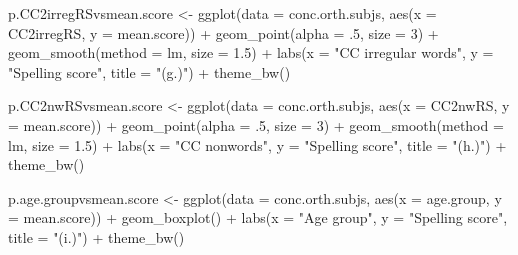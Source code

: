 \documentclass[
  letterpaper,
  DIV=11,
  numbers=noendperiod]{scrreprt}
\newenvironment{Shaded}{\begin{snugshade}}{\end{snugshade}}
\newcommand{\AttributeTok}[1]{\textcolor[rgb]{0.40,0.45,0.13}{#1}}
\newcommand{\DecValTok}[1]{\textcolor[rgb]{0.68,0.00,0.00}{#1}}
\newcommand{\FloatTok}[1]{\textcolor[rgb]{0.68,0.00,0.00}{#1}}
\newcommand{\FunctionTok}[1]{\textcolor[rgb]{0.28,0.35,0.67}{#1}}
\newcommand{\NormalTok}[1]{\textcolor[rgb]{0.00,0.23,0.31}{#1}}
\newcommand{\OtherTok}[1]{\textcolor[rgb]{0.00,0.23,0.31}{#1}}
\newcommand{\SpecialCharTok}[1]{\textcolor[rgb]{0.37,0.37,0.37}{#1}}
\newcommand{\StringTok}[1]{\textcolor[rgb]{0.13,0.47,0.30}{#1}}
\begin{document}
\begin{Shaded}
\begin{Highlighting}[]
\NormalTok{p.CC2irregRSvsmean.score }\OtherTok{\textless{}{-}} \FunctionTok{ggplot}\NormalTok{(}\AttributeTok{data =}\NormalTok{ conc.orth.subjs, }
                              \FunctionTok{aes}\NormalTok{(}\AttributeTok{x =}\NormalTok{ CC2irregRS, }
                                  \AttributeTok{y =}\NormalTok{ mean.score)) }\SpecialCharTok{+}
  \FunctionTok{geom\_point}\NormalTok{(}\AttributeTok{alpha =}\NormalTok{ .}\DecValTok{5}\NormalTok{, }\AttributeTok{size =} \DecValTok{3}\NormalTok{) }\SpecialCharTok{+}
  \FunctionTok{geom\_smooth}\NormalTok{(}\AttributeTok{method =} \StringTok{\textquotesingle{}lm\textquotesingle{}}\NormalTok{, }\AttributeTok{size =} \FloatTok{1.5}\NormalTok{) }\SpecialCharTok{+}
  \FunctionTok{labs}\NormalTok{(}\AttributeTok{x =} \StringTok{"CC irregular words"}\NormalTok{, }
       \AttributeTok{y =} \StringTok{"Spelling score"}\NormalTok{,}
       \AttributeTok{title =} \StringTok{"(g.)"}\NormalTok{) }\SpecialCharTok{+}
  \FunctionTok{theme\_bw}\NormalTok{()}

\NormalTok{p.CC2nwRSvsmean.score }\OtherTok{\textless{}{-}} \FunctionTok{ggplot}\NormalTok{(}\AttributeTok{data =}\NormalTok{ conc.orth.subjs, }
                              \FunctionTok{aes}\NormalTok{(}\AttributeTok{x =}\NormalTok{ CC2nwRS, }
                                  \AttributeTok{y =}\NormalTok{ mean.score)) }\SpecialCharTok{+}
  \FunctionTok{geom\_point}\NormalTok{(}\AttributeTok{alpha =}\NormalTok{ .}\DecValTok{5}\NormalTok{, }\AttributeTok{size =} \DecValTok{3}\NormalTok{) }\SpecialCharTok{+}
  \FunctionTok{geom\_smooth}\NormalTok{(}\AttributeTok{method =} \StringTok{\textquotesingle{}lm\textquotesingle{}}\NormalTok{, }\AttributeTok{size =} \FloatTok{1.5}\NormalTok{) }\SpecialCharTok{+}
  \FunctionTok{labs}\NormalTok{(}\AttributeTok{x =} \StringTok{"CC nonwords"}\NormalTok{, }
       \AttributeTok{y =} \StringTok{"Spelling score"}\NormalTok{,}
       \AttributeTok{title =} \StringTok{"(h.)"}\NormalTok{) }\SpecialCharTok{+}
  \FunctionTok{theme\_bw}\NormalTok{()}

\NormalTok{p.age.groupvsmean.score }\OtherTok{\textless{}{-}} \FunctionTok{ggplot}\NormalTok{(}\AttributeTok{data =}\NormalTok{ conc.orth.subjs, }
                              \FunctionTok{aes}\NormalTok{(}\AttributeTok{x =}\NormalTok{ age.group, }
                                  \AttributeTok{y =}\NormalTok{ mean.score)) }\SpecialCharTok{+}
  \FunctionTok{geom\_boxplot}\NormalTok{() }\SpecialCharTok{+}
  \FunctionTok{labs}\NormalTok{(}\AttributeTok{x =} \StringTok{"Age group"}\NormalTok{, }
       \AttributeTok{y =} \StringTok{"Spelling score"}\NormalTok{,}
       \AttributeTok{title =} \StringTok{"(i.)"}\NormalTok{) }\SpecialCharTok{+}
  \FunctionTok{theme\_bw}\NormalTok{()}


\end{Highlighting}
\end{Shaded}
\end{document}
